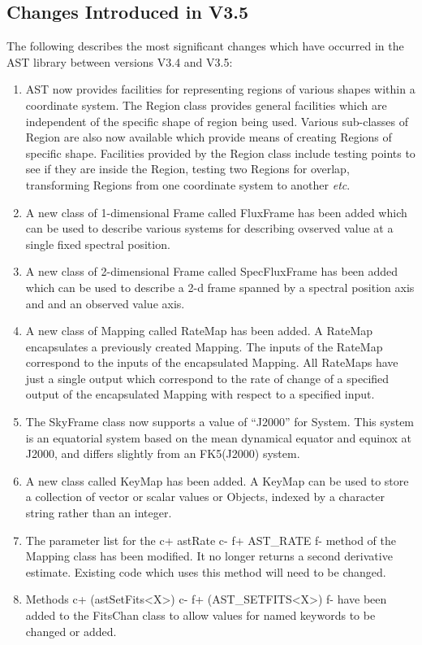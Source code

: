 \documentclass[twoside,11pt]{starlink}
\begin{document}
\subsection{Changes Introduced in V3.5}

The following describes the most significant changes which have
occurred in the AST library between versions V3.4 and V3.5:

\begin{enumerate}

\item AST now provides facilities for representing regions of various
shapes within a coordinate system. The Region class provides general
facilities which are independent of the specific shape of region being
used. Various sub-classes of Region are also now available which provide
means of creating Regions of specific shape. Facilities provided by the
Region class include testing points to see if they are inside the
Region, testing two Regions for overlap, transforming Regions from one
coordinate system to another \emph{etc}.

\item A new class of 1-dimensional Frame called FluxFrame has been added which
can be used to describe various systems for describing ovserved value at a
single fixed spectral position.

\item A new class of 2-dimensional Frame called SpecFluxFrame has been added which
can be used to describe a 2-d frame spanned by a spectral position axis
and and an observed value axis.

\item A new class of Mapping called RateMap has been added. A RateMap encapsulates
a previously created Mapping. The inputs of the RateMap correspond to the
inputs of the encapsulated Mapping. All RateMaps have just a single
output which correspond to the rate of change of a specified output of
the encapsulated Mapping with respect to a specified input.

\item The SkyFrame class now supports a value of ``J2000'' for System.
This system is an equatorial system based on the mean dynamical equator and
equinox at J2000, and differs slightly from an FK5(J2000) system.

\item A new class called KeyMap has been added. A KeyMap can be used to
store a collection of vector or scalar values or Objects, indexed by a
character string rather than an integer.

\item The parameter list for the
c+
astRate
c-
f+
AST\_RATE
f-
method of the Mapping class has been modified. It no longer returns a second
derivative estimate. Existing code which uses this method will need to be
changed.

\item Methods
c+
(astSetFits<X>)
c-
f+
(AST\_SETFITS<X>)
f-
have been added to the FitsChan class to allow values for named
keywords to be changed or added.

\end{enumerate}
\end{document}
